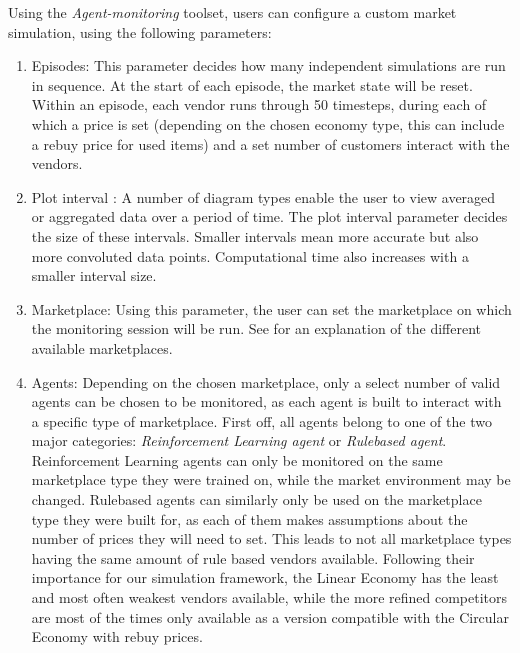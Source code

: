 Using the \emph{Agent-monitoring} toolset, users can configure a custom market simulation, using the following parameters:

\begin{enumerate}
	\item Episodes: This parameter decides how many independent simulations are run in sequence. At the start of each episode, the market state will be reset. Within an episode, each vendor runs through 50 timesteps, during each of which a price is set (depending on the chosen economy type, this can include a rebuy price for used items) and a set number of customers interact with the vendors.
	\item Plot interval : A number of diagram types enable the user to view averaged or aggregated data over a period of time. The plot interval parameter decides the size of these intervals. Smaller intervals mean more accurate but also more convoluted data points. Computational time also increases with a smaller interval size.
	\item Marketplace: Using this parameter, the user can set the marketplace on which the monitoring session will be run. See  for an explanation of the different available marketplaces. 
	\item Agents: Depending on the chosen marketplace, only a select number of valid agents can be chosen to be monitored, as each agent is built to interact with a specific type of marketplace. First off, all agents belong to one of the two major categories: \emph{Reinforcement Learning agent} or \emph{Rulebased agent}. Reinforcement Learning agents can only be monitored on the same marketplace type they were trained on, while the market environment may be changed. Rulebased agents can similarly only be used on the marketplace type they were built for, as each of them makes assumptions about the number of prices they will need to set. This leads to not all marketplace types having the same amount of rule based vendors available. Following their importance for our simulation framework, the Linear Economy has the least and most often weakest vendors available, while the more refined competitors are most of the times only available as a version compatible with the Circular Economy with rebuy prices.
\end{enumerate}

